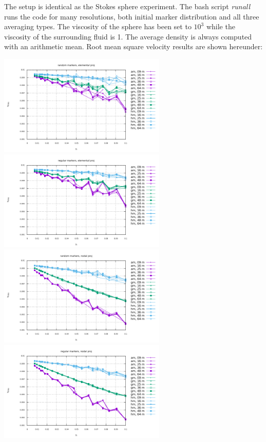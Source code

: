 The setup is identical as the Stokes sphere experiment. The bash script {\sl runall} runs the code for many resolutions,
both initial marker distribution and all three averaging types. The viscosity of the sphere has been 
set to $10^3$ while the viscosity of the surrounding fluid is 1. 
The average density is always computed with an arithmetic mean. 
Root mean square velocity results are shown hereunder:

\begin{center}
\includegraphics[width=8cm]{python_codes/fieldstone_markers_avrg/vrms_rand_proj1} 
\includegraphics[width=8cm]{python_codes/fieldstone_markers_avrg/vrms_norand_proj1}\\ 
\includegraphics[width=8cm]{python_codes/fieldstone_markers_avrg/vrms_rand_proj2} 
\includegraphics[width=8cm]{python_codes/fieldstone_markers_avrg/vrms_norand_proj2}\\ 

\end{center}
